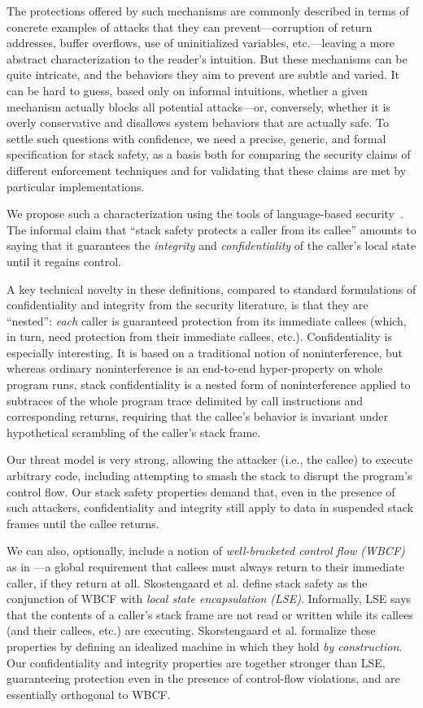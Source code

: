 \documentclass[acmsmall,review,anonymous]{acmart}\settopmatter{printfolios=true,printccs=false,printacmref=false}
\begin{document}
The protections offered by such mechanisms are commonly described in terms
of concrete examples of attacks that they can prevent---corruption of return
addresses, buffer overflows, use of uninitialized variables, etc.---leaving
a more abstract characterization to the reader's intuition.  But these
mechanisms can be quite intricate, and the behaviors they aim to prevent are
subtle and varied.  It can be hard to guess, based only on informal
intuitions, whether a given mechanism actually blocks all potential
attacks---or, conversely, whether it is overly conservative and disallows
system behaviors that are actually safe.
To settle such questions with confidence,
we need a precise, generic, and formal specification for stack
safety, as a basis both for comparing the security claims of different
enforcement techniques and for validating that these claims
are met by particular implementations.

We propose such a characterization using the tools of language-based
security~\citep{sabelfeld2003language}. The informal claim that
``stack safety protects a caller
from its callee'' amounts to saying that it guarantees the {\em integrity} and
{\em confidentiality} of the caller’s local state until it regains control.

A key technical novelty in these definitions,
compared to standard formulations of confidentiality and integrity from the
security literature, is that they
are ``nested'': {\em each} caller is guaranteed protection from its
immediate callees (which, in turn, need protection from their immediate
callees, etc.).
Confidentiality is especially interesting. It is based on a traditional
notion of noninterference, but whereas ordinary noninterference
is an end-to-end hyper-property on whole program runs, stack
confidentiality is a nested form of noninterference applied to
subtraces of the whole program trace delimited by call instructions
and corresponding returns, requiring that the callee’s behavior is
invariant under hypothetical scrambling of the caller’s stack frame.

Our threat model is very strong, allowing the attacker (i.e., the
callee) to execute arbitrary code, including attempting to smash
the stack to disrupt the program’s control flow. Our stack safety
properties demand that, even in the presence of such attackers, confidentiality
and integrity still apply to data in suspended stack frames
until the callee returns.

We can also, optionally, include a notion of {\em well-bracketed control
flow (WBCF)} as in \citet{SkorstengaardSTKJFP}---a global requirement that
callees must always return to their immediate caller, if they return
at all. Skostengaard et al. define stack safety as the conjunction of WBCF with
{\em local state encapsulation (LSE)}.
Informally, LSE says that the contents of
a caller's stack frame are not read or written while its callees (and their callees, etc.) are
executing.
Skorstengaard et al. formalize these properties by defining an idealized
machine in which they hold {\em by construction}. Our confidentiality and
integrity properties are together stronger than LSE, guaranteeing protection even
in the presence of control-flow violations, and are essentially orthogonal to WBCF.
\end{document}
